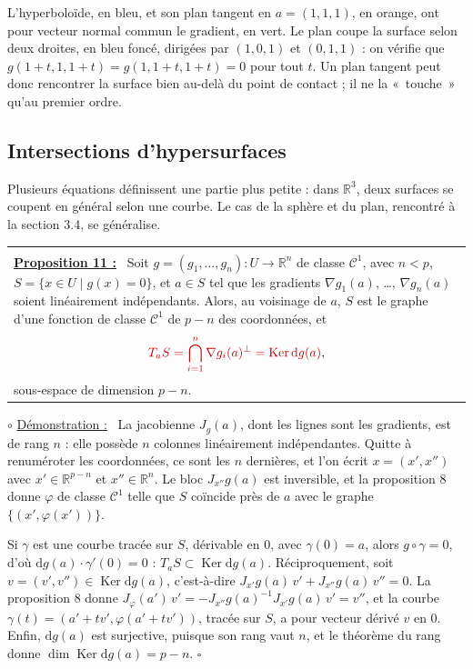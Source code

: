 \documentclass[a4paper,twoside]{report}
\makeatletter
\newcommand{\rmath}[1]{\textcolor{rougecours}{#1}}
\newenvironment{cadre}%
 {\par\vspace{2mm}\noindent\begin{tabular}{|@{\hspace{4mm}}p{0.93\textwidth}@{\hspace{4mm}}|}
  \hline \\[-2mm]}%
 {\\[2mm] \hline \end{tabular}\par\vspace{3mm}}
\newcommand{\propo}[1]{\textbf{\underline{Proposition #1 :}}~}
\newenvironment{demo}%
 {\par\needspace{4\baselineskip}\vspace{1mm}\noindent$\circ$ \underline{Démonstration :}~\setlength{\parskip}{3pt plus 1pt}}%
 {\hfill$\square$\par\vspace{2mm}}
\newcommand{\R}{\mathbb{R}}
\newcommand{\dd}{\mathrm{d}}                      %
\newcommand{\Ker}{\operatorname{Ker}}
\newcommand{\Cc}{\mathcal{C}}                     %
\newcommand{\grad}{\nabla}                        %
\newcommand{\Jac}{J}                              %
\makeatother
\begin{document}
\noindent L'hyperboloïde, en bleu, et son plan tangent en $a = (1, 1, 1)$, en orange, ont pour vecteur normal commun le gradient, en vert. Le plan coupe la surface selon deux droites, en bleu foncé, dirigées par $(1, 0, 1)$ et $(0, 1, 1)$ : on vérifie que $g(1 + t, 1, 1 + t) = g(1, 1 + t, 1 + t) = 0$ pour tout $t$. Un plan tangent peut donc rencontrer la surface bien au-delà du point de contact ; il ne la «~touche~» qu'au premier ordre.

\subsection{Intersections d'hypersurfaces}

Plusieurs équations définissent une partie plus petite : dans $\R^{3}$, deux surfaces se coupent en général selon une courbe. Le cas de la sphère et du plan, rencontré à la section 3.4, se généralise.

\begin{cadre}
\propo{11} Soit $g = (g_{1}, \dots, g_{n}) : U \to \R^{n}$ de classe $\Cc^{1}$, avec $n < p$, $S = \{x \in U \mid g(x) = 0\}$, et $a \in S$ tel que les gradients $\grad g_{1}(a)$, \dots, $\grad g_{n}(a)$ soient linéairement indépendants. Alors, au voisinage de $a$, $S$ est le graphe d'une fonction de classe $\Cc^{1}$ de $p - n$ des coordonnées, et
\[ \rmath{T_{a}S = \bigcap_{i = 1}^{n} \grad g_{i}(a)^{\perp} = \Ker \dd g(a)}, \]
sous-espace de dimension $p - n$.
\end{cadre}

\begin{demo}
La jacobienne $\Jac_{g}(a)$, dont les lignes sont les gradients, est de rang $n$ : elle possède $n$ colonnes linéairement indépendantes. Quitte à renuméroter les coordonnées, ce sont les $n$ dernières, et l'on écrit $x = (x', x'')$ avec $x' \in \R^{p - n}$ et $x'' \in \R^{n}$. Le bloc $\Jac_{x''} g(a)$ est inversible, et la proposition 8 donne $\varphi$ de classe $\Cc^{1}$ telle que $S$ coïncide près de $a$ avec le graphe $\{(x', \varphi(x'))\}$.

Si $\gamma$ est une courbe tracée sur $S$, dérivable en $0$, avec $\gamma(0) = a$, alors $g \circ \gamma = 0$, d'où $\dd g(a)\cdot\gamma'(0) = 0$ : $T_{a}S \subset \Ker \dd g(a)$. Réciproquement, soit $v = (v', v'') \in \Ker \dd g(a)$, c'est-à-dire $\Jac_{x'} g(a)\,v' + \Jac_{x''} g(a)\,v'' = 0$. La proposition 8 donne $\Jac_{\varphi}(a')\,v' = -\Jac_{x''} g(a)^{-1}\Jac_{x'} g(a)\,v' = v''$, et la courbe $\gamma(t) = (a' + tv', \varphi(a' + tv'))$, tracée sur $S$, a pour vecteur dérivé $v$ en $0$. Enfin, $\dd g(a)$ est surjective, puisque son rang vaut $n$, et le théorème du rang donne $\dim \Ker \dd g(a) = p - n$.
\end{demo}
\end{document}
